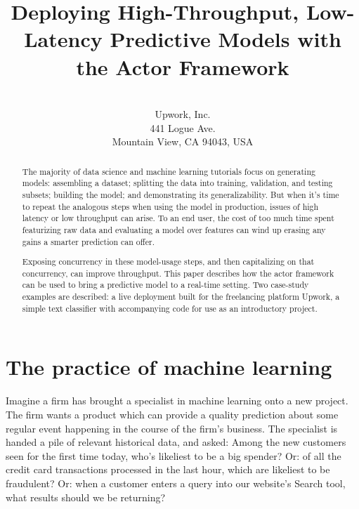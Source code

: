 \documentclass[tablecaption=bottom,wcp]{jmlr}
\begin{document}
\title{Deploying High-Throughput, Low-Latency Predictive Models with the Actor Framework}

\author{  \\
\addr Upwork, Inc. \\
441 Logue Ave. \\
Mountain View, CA 94043, USA
}

\maketitle

\begin{abstract}
 The majority of data science and machine learning tutorials focus on generating
models: assembling a dataset; splitting the data into training, validation, and
testing subsets; building the model; and demonstrating its generalizability. But
when it's time to repeat the analogous steps when using the model in production,
issues of high latency or low throughput can arise. To an end user, the cost of
too much time spent featurizing raw data and evaluating a model over features
can wind up erasing any gains a smarter prediction can offer.

 Exposing concurrency in these model-usage steps, and then capitalizing on that
concurrency, can improve throughput. This paper describes how the actor
framework can be used to bring a predictive model to a real-time setting. Two
case-study examples are described: a live deployment built for the freelancing 
platform Upwork, a simple text classifier with accompanying code for use as an
introductory project.
\end{abstract}

\section{The practice of machine learning}

 Imagine a firm has brought a specialist in machine learning onto a new project.
The firm wants a product which can provide a quality prediction about some
regular event happening in the course of the firm's business. The specialist is
handed a pile of relevant historical data, and asked: Among the new customers
seen for the first time today, who's likeliest to be a big spender? Or: of all
the credit card transactions processed in the last hour, which are likeliest to
be fraudulent? Or: when a customer enters a query into our website's Search
tool, what results should we be returning?
\end{document}
